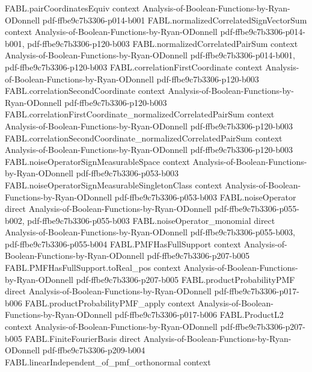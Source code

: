\begin{theorem}
  {FABL.pairCoordinatesEquiv}
  {context}
  {Analysis-of-Boolean-Functions-by-Ryan-ODonnell}
  {pdf-ffbe9c7b3306-p014-b001}
\proofstep
  {FABL.normalizedCorrelatedSignVectorSum}
  {context}
  {Analysis-of-Boolean-Functions-by-Ryan-ODonnell}
  {pdf-ffbe9c7b3306-p014-b001,
    pdf-ffbe9c7b3306-p120-b003}
\proofstep
  {FABL.normalizedCorrelatedPairSum}
  {context}
  {Analysis-of-Boolean-Functions-by-Ryan-ODonnell}
  {pdf-ffbe9c7b3306-p014-b001,
    pdf-ffbe9c7b3306-p120-b003}
\proofstep
  {FABL.correlationFirstCoordinate}
  {context}
  {Analysis-of-Boolean-Functions-by-Ryan-ODonnell}
  {pdf-ffbe9c7b3306-p120-b003}
\proofstep
  {FABL.correlationSecondCoordinate}
  {context}
  {Analysis-of-Boolean-Functions-by-Ryan-ODonnell}
  {pdf-ffbe9c7b3306-p120-b003}
\proofstep
  {FABL.correlationFirstCoordinate_normalizedCorrelatedPairSum}
  {context}
  {Analysis-of-Boolean-Functions-by-Ryan-ODonnell}
  {pdf-ffbe9c7b3306-p120-b003}
\proofstep
  {FABL.correlationSecondCoordinate_normalizedCorrelatedPairSum}
  {context}
  {Analysis-of-Boolean-Functions-by-Ryan-ODonnell}
  {pdf-ffbe9c7b3306-p120-b003}
\proofstep
  {FABL.noiseOperatorSignMeasurableSpace}
  {context}
  {Analysis-of-Boolean-Functions-by-Ryan-ODonnell}
  {pdf-ffbe9c7b3306-p053-b003}
\proofstep
  {FABL.noiseOperatorSignMeasurableSingletonClass}
  {context}
  {Analysis-of-Boolean-Functions-by-Ryan-ODonnell}
  {pdf-ffbe9c7b3306-p053-b003}
\proofstep
  {FABL.noiseOperator}
  {direct}
  {Analysis-of-Boolean-Functions-by-Ryan-ODonnell}
  {pdf-ffbe9c7b3306-p055-b002,
    pdf-ffbe9c7b3306-p055-b003}
\proofstep
  {FABL.noiseOperator_monomial}
  {direct}
  {Analysis-of-Boolean-Functions-by-Ryan-ODonnell}
  {pdf-ffbe9c7b3306-p055-b003,
    pdf-ffbe9c7b3306-p055-b004}
\proofstep
  {FABL.PMFHasFullSupport}
  {context}
  {Analysis-of-Boolean-Functions-by-Ryan-ODonnell}
  {pdf-ffbe9c7b3306-p207-b005}
\proofstep
  {FABL.PMFHasFullSupport.toReal_pos}
  {context}
  {Analysis-of-Boolean-Functions-by-Ryan-ODonnell}
  {pdf-ffbe9c7b3306-p207-b005}
\proofstep
  {FABL.productProbabilityPMF}
  {direct}
  {Analysis-of-Boolean-Functions-by-Ryan-ODonnell}
  {pdf-ffbe9c7b3306-p017-b006}
\proofstep
  {FABL.productProbabilityPMF_apply}
  {context}
  {Analysis-of-Boolean-Functions-by-Ryan-ODonnell}
  {pdf-ffbe9c7b3306-p017-b006}
\proofstep
  {FABL.ProductL2}
  {context}
  {Analysis-of-Boolean-Functions-by-Ryan-ODonnell}
  {pdf-ffbe9c7b3306-p207-b005}
\proofstep
  {FABL.FiniteFourierBasis}
  {direct}
  {Analysis-of-Boolean-Functions-by-Ryan-ODonnell}
  {pdf-ffbe9c7b3306-p209-b004}
\proofstep
  {FABL.linearIndependent_of_pmf_orthonormal}
  {context}

\end{theorem}
